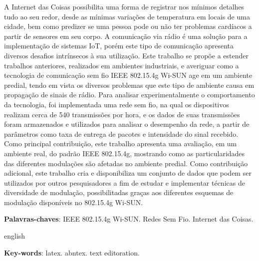 \setlength{\absparsep}{18pt} %
\begin{resumo}
  A Internet das Coisas possibilita uma forma de registrar nos mínimos detalhes tudo ao seu redor, desde as mínimas variações de temperatura em locais de uma cidade, bem como predizer se uma pessoa pode ou não ter problemas cardíacos a partir de sensores em seu corpo. A comunicação via rádio é uma solução para a implementação de sistemas IoT, porém este tipo de comunicação apresenta diversos desafios intrínsecos à sua utilização.
  Este trabalho se propõe a estender trabalhos anteriores, realizados em ambientes industriais, e averiguar como a tecnologia de comunicação sem fio IEEE 802.15.4g Wi-SUN age em um ambiente predial, tendo em vista os diversos problemas que este tipo de ambiente causa em propagação de sinais de rádio.
  Para analisar experimentalmente o comportamento da tecnologia, foi implementada uma rede sem fio, na qual os dispositivos realizam cerca de 540 transmissões por hora, e os dados de suas transmissões foram armazenados e utilizados para analisar o desempenho da rede, a partir de parâmetros como taxa de entrega de pacotes e intensidade do sinal recebido.
  Como principal contribuição, este trabalho apresenta uma avaliação, em um ambiente real, do padrão IEEE 802.15.4g, mostrando como as particularidades das diferentes modulações são afetadas no ambiente predial.
  Como contribuição adicional, este trabalho cria e disponibiliza um conjunto de dados que podem ser utilizados por outros pesquisadores a fim de estudar e implementar técnicas de diversidade de modulação, possibilitadas graças aos diferentes esquemas de modulação disponíveis no 802.15.4g Wi-SUN.


  \textbf{Palavras-chaves}: IEEE 802.15.4g Wi-SUN. Redes Sem Fio. Internet das Coisas.
\end{resumo}

\begin{resumo}[Abstract]
  \begin{otherlanguage*}{english}


    \vspace{\onelineskip}

    \noindent
    \textbf{Key-words}: latex. abntex. text editoration.
  \end{otherlanguage*}
\end{resumo}


